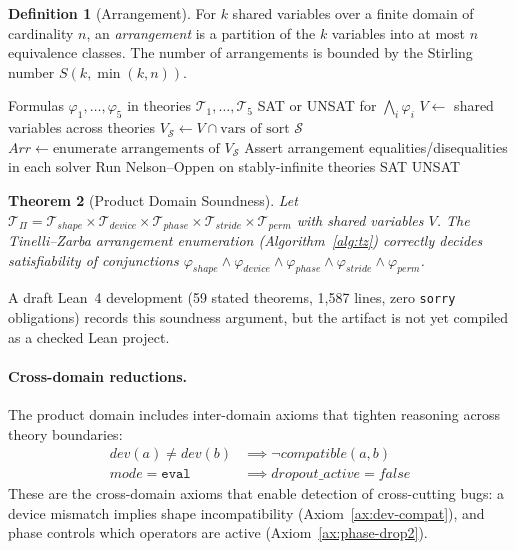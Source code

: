 \documentclass[10pt]{article}
\newcommand{\Tshape}{\mathcal{T}_{\mathit{shape}}}
\newcommand{\Tdevice}{\mathcal{T}_{\mathit{device}}}
\newcommand{\Tphase}{\mathcal{T}_{\mathit{phase}}}
\newcommand{\Tstride}{\mathcal{T}_{\mathit{stride}}}
\newcommand{\Tperm}{\mathcal{T}_{\mathit{perm}}}
\newcommand{\Tprod}{\mathcal{T}_{\Pi}}
\theoremstyle{plain}
\newtheorem{theorem}{Theorem}[section]
\theoremstyle{definition}
\newtheorem{definition}[theorem]{Definition}
\theoremstyle{remark}
\begin{document}
\begin{definition}[Arrangement]\label{def:arrangement}
For $k$ shared variables over a finite domain of cardinality $n$, an
\emph{arrangement} is a partition of the $k$ variables into at most
$n$ equivalence classes.  The number of arrangements is bounded by
the Stirling number $S(k, \min(k, n))$.
\end{definition}

\begin{algorithm}[t]
\caption{Tinelli--Zarba combination for $\Tprod$}
\label{alg:tz}
\begin{algorithmic}[1]
\Require Formulas $\varphi_1, \ldots, \varphi_5$ in theories
  $\mathcal{T}_1, \ldots, \mathcal{T}_5$
\Ensure SAT or UNSAT for $\bigwedge_i \varphi_i$
\State $V \gets$ shared variables across theories
  \State $V_{\mathcal{S}} \gets V \cap \text{vars of sort } \mathcal{S}$
  \State $\mathit{Arr} \gets \text{enumerate arrangements of } V_{\mathcal{S}}$
\EndFor
{}
  \State Assert arrangement equalities/disequalities in each solver
  \State Run Nelson--Oppen on stably-infinite theories
    \Return SAT
  \EndIf
\EndFor
\Return UNSAT
\end{algorithmic}
\end{algorithm}

\begin{theorem}[Product Domain Soundness]\label{thm:combination}
Let $\Tprod = \Tshape \times \Tdevice \times \Tphase \times
\Tstride \times \Tperm$ with shared variables $V$.  The
Tinelli--Zarba arrangement enumeration (Algorithm~\ref{alg:tz})
correctly decides satisfiability of conjunctions
$\varphi_{\mathit{shape}} \land \varphi_{\mathit{device}} \land
\varphi_{\mathit{phase}} \land \varphi_{\mathit{stride}} \land
\varphi_{\mathit{perm}}$.
\end{theorem}

A draft Lean~4 development (59 stated theorems, 1{,}587 lines, zero
\texttt{sorry} obligations) records this soundness argument, but the
artifact is not yet compiled as a checked Lean project.

\paragraph{Cross-domain reductions.}
The product domain includes inter-domain axioms that tighten
reasoning across theory boundaries:
\begin{align}
  \mathit{dev}(a) \neq \mathit{dev}(b) &\implies
    \neg\mathit{compatible}(a, b)
    \label{ax:dev-compat} \\
  \mathit{mode} = \texttt{eval} &\implies
    \mathit{dropout\_active} = \mathit{false}
    \label{ax:phase-drop2}
\end{align}
These are the cross-domain axioms that enable detection of
cross-cutting bugs: a device mismatch implies shape incompatibility
(Axiom~\ref{ax:dev-compat}), and phase controls which operators are
active (Axiom~\ref{ax:phase-drop2}).
\end{document}
